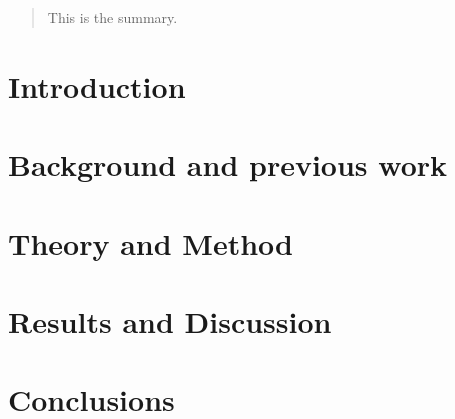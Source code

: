 \documentclass[11pt, a4paper]{report}
\begin{document}
\begin{abstract}
  This is the summary.
\end{abstract}

\chapter{Introduction}

\chapter{Background and previous work}

\chapter{Theory and Method}

\chapter{Results and Discussion}

\chapter{Conclusions}
\end{document}
